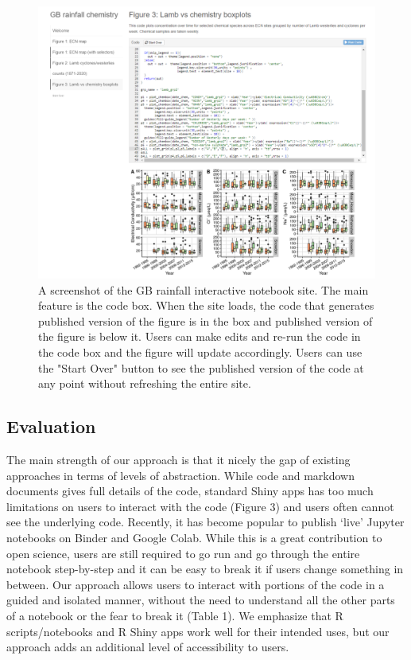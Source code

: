 \begin{Schunk}
\begin{figure}
\includegraphics[width=\textwidth]{GB_notebook_screenshot} \caption[A screenshot of the GB rainfall interactive notebook site]{A screenshot of the GB rainfall interactive notebook site. The main feature is the code box. When the site loads, the code that generates published version of the figure is in the box and published version of the figure is below it. Users can make edits and re-run the code in the code box and the figure will update accordingly. Users can use the "Start Over" button to see the published version of the code at any point without refreshing the entire site.}\label{fig:fig2}
\end{figure}
\end{Schunk}

\hypertarget{evaluation}{%
\subsection{Evaluation}\label{evaluation}}

The main strength of our approach is that it \DIFdelbegin {}\DIFdelend \DIFaddbegin {}\DIFaddend nicely the gap of
existing approaches in terms of levels of abstraction. While code and
markdown documents gives full details of the code, standard \DIFaddbegin {}\DIFaddend Shiny apps
has too much limitations on users to interact with the code (Figure 3)
and users often cannot see the underlying code. Recently, it has become
popular to publish `live' Jupyter notebooks on Binder and Google Colab.
While this is a great contribution to open science, users are still
required to go run and go through the entire notebook step-by-step and
it can be easy to break it if users change something in between. Our
approach allows users to interact with portions of the code in a guided
and isolated manner, without the need to understand all the other parts
of a notebook or the fear to break it (Table 1). We emphasize that R
scripts/notebooks and R Shiny apps work well for their intended uses,
but our approach adds an additional level of accessibility to users.


